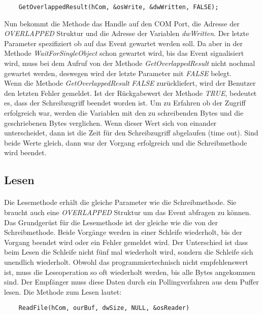 \begin{lstlisting}
	GetOverlappedResult(hCom, &osWrite, &dwWritten, FALSE);
\end{lstlisting}

Nun bekommt die Methode das Handle auf den COM Port, die Adresse der \textit{OVERLAPPED} Struktur und die Adresse der Variablen \textit{dwWritten}. Der letzte Parameter spezifiziert ob auf das Event gewartet werden soll. Da aber in der Methode \textit{WaitForSingleObject} schon gewartet wird, bis das Event signalisiert wird, muss bei dem Aufruf von der Methode \textit{GetOverlappedResult} nicht nochmal gewartet werden, deswegen wird der letzte Parameter mit \textit{FALSE} belegt.\\

Wenn die Methode \textit{GetOverlappedResult} \textit{FALSE} zurückliefert, wird der Benutzer den letzten Fehler gemeldet. Ist der Rückgabewert der Methode \textit{TRUE}, bedeutet es, dass der Schreibzugriff beendet worden ist. Um zu Erfahren ob der Zugriff erfolgreich war, werden die Variablen mit den zu schreibenden Bytes und die geschriebenen Bytes verglichen. Wenn dieser Wert sich von einander unterscheidet, dann ist die Zeit für den Schreibzugriff abgelaufen (time out). Sind beide Werte gleich, dann war der Vorgang erfolgreich und die Schreibmethode wird beendet.


\subsection{Lesen}
\paragraph{}
Die Lesemethode erhält die gleiche Parameter wie die Schreibmethode. Sie braucht auch eine \textit{OVERLAPPED} Struktur um das Event abfragen zu können. Das Grundgerüst für die Lesemethode ist der gleiche wie die von der Schreibmethode. Beide Vorgänge werden in einer Schleife wiederholt, bis der Vorgang beendet wird oder ein Fehler gemeldet wird. Der Unterschied ist dass beim Lesen die Schleife nicht fünf mal wiederholt wird, sondern die Schleife sich unendlich wiederholt. Obwohl das programmiertechnisch nicht empfehlenswert ist, muss die Leseoperation so oft wiederholt werden, bis alle Bytes angekommen sind. Der Empfänger muss diese Daten durch ein Pollingverfahren aus dem Puffer lesen. Die Methode zum Lesen lautet:

\begin{lstlisting}
	ReadFile(hCom, ourBuf, dwSize, NULL, &osReader)
\end{lstlisting}

